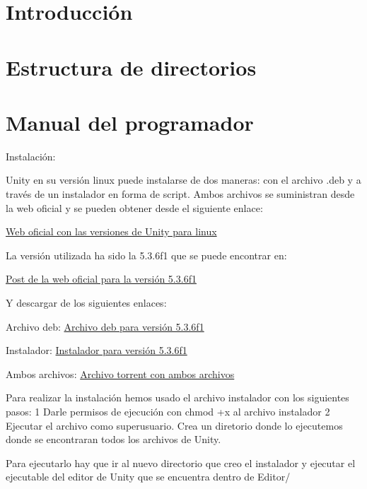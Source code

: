 
\section{Introducción}

\section{Estructura de directorios}

\section{Manual del programador}
Instalación:

Unity en su versión linux puede instalarse de dos maneras: con el archivo .deb y a través de un instalador en forma de script. Ambos archivos se suministran desde la web oficial y se pueden obtener desde el siguiente enlace:

\href{https://forum.unity3d.com/threads/unity-on-linux-release-notes-and-known-issues.350256/}{Web oficial con las versiones de Unity para linux}

La versión utilizada ha sido la 5.3.6f1 que se puede encontrar en:

\href{https://forum.unity3d.com/threads/unity-on-linux-release-notes-and-known-issues.350256/#post-2717623}{Post de la web oficial para la versión 5.3.6f1}

Y descargar de los siguientes enlaces:

Archivo deb: \href{http://download.unity3d.com/download_unity/linux/unity-editor-5.3.6f1+20160720_amd64.deb}{Archivo deb para versión 5.3.6f1}

Instalador: \href{http://download.unity3d.com/download_unity/linux/unity-editor-installer-5.3.6f1+20160720.sh}{Instalador para versión 5.3.6f1}

Ambos archivos: \href{http://files.unity3d.com/levi/unity-editor-5.3.6f1+20160720.torrent}{Archivo torrent con ambos archivos}

Para realizar la instalación hemos usado el archivo instalador con los siguientes pasos:
1 Darle permisos de ejecución con chmod +x al archivo instalador
2 Ejecutar el archivo como superusuario. Crea un diretorio donde lo ejecutemos donde se encontraran todos los archivos de Unity.

Para ejecutarlo hay que ir al nuevo directorio que creo el instalador y ejecutar el ejecutable del editor de Unity que se encuentra dentro de Editor/ 

